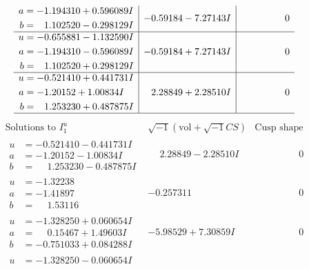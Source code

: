\documentclass[1p]{elsarticle_modified}
\theoremstyle{definition}
\newcommand{\I}{\sqrt{-1}}
\begin{document}
$$\begin{array}{c|c|c}
\begin{aligned}
a &= -1.194310 + 0.596089 I \\
b &= \phantom{-}1.102520 - 0.298129 I\end{aligned}
 & -0.59184 - 7.27143 I & \phantom{-0.000000 } 0 \\ \hline\begin{aligned}
u &= -0.655881 - 1.132590 I \\
a &= -1.194310 - 0.596089 I \\
b &= \phantom{-}1.102520 + 0.298129 I\end{aligned}
 & -0.59184 + 7.27143 I & \phantom{-0.000000 } 0 \\ \hline\begin{aligned}
u &= -0.521410 + 0.441731 I \\
a &= -1.20152 + 1.00834 I \\
b &= \phantom{-}1.253230 + 0.487875 I\end{aligned}
 & \phantom{-}2.28849 + 2.28510 I & \phantom{-0.000000 } 0\\
 \hline 
 \end{array}$$\newpage$$\begin{array}{c|c|c}  
\text{Solutions to }I^u_{1}& \I (\text{vol} + \sqrt{-1}CS) & \text{Cusp shape}\\
 \hline 
\begin{aligned}
u &= -0.521410 - 0.441731 I \\
a &= -1.20152 - 1.00834 I \\
b &= \phantom{-}1.253230 - 0.487875 I\end{aligned}
 & \phantom{-}2.28849 - 2.28510 I & \phantom{-0.000000 } 0 \\ \hline\begin{aligned}
u &= -1.32238\phantom{ +0.000000I} \\
a &= -1.41897\phantom{ +0.000000I} \\
b &= \phantom{-}1.53116\phantom{ +0.000000I}\end{aligned}
 & -0.257311\phantom{ +0.000000I} & \phantom{-0.000000 } 0 \\ \hline\begin{aligned}
u &= -1.328250 + 0.060654 I \\
a &= \phantom{-}0.15467 + 1.49603 I \\
b &= -0.751033 + 0.084288 I\end{aligned}
 & -5.98529 + 7.30859 I & \phantom{-0.000000 } 0 \\ \hline\begin{aligned}
u &= -1.328250 - 0.060654 I \\

\end{aligned}
\end{array}$$
\end{document}
